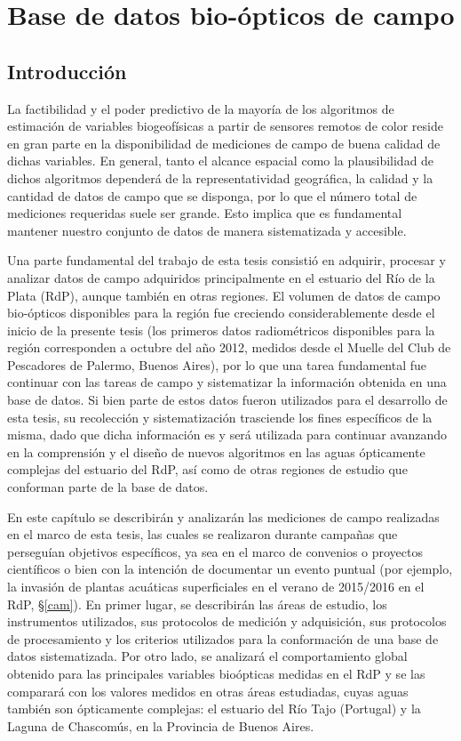 \chapter{Base de datos bio-ópticos de campo}
\label{dat}

\section{Introducción}
\label{dat:s:intro}

    La factibilidad y el poder predictivo de la mayoría de los algoritmos de estimación de variables biogeofísicas a partir de sensores remotos de color reside en gran parte en la disponibilidad de mediciones de campo de buena calidad de dichas variables. En general, tanto el alcance espacial como la plausibilidad de dichos algoritmos dependerá de la representatividad geográfica, la calidad y la cantidad de datos de campo que se disponga, por lo que el número total de mediciones requeridas suele ser grande. Esto implica que es fundamental mantener nuestro conjunto de datos de manera sistematizada y accesible.
    
    Una parte fundamental del trabajo de esta tesis consistió en adquirir, procesar y analizar datos de campo adquiridos principalmente en el estuario del Río de la Plata (RdP), aunque también en otras regiones. El volumen de datos de campo bio-ópticos disponibles para la región fue creciendo considerablemente desde el inicio de la presente tesis (los primeros datos radiométricos disponibles para la región corresponden a octubre del año 2012, medidos desde el Muelle del Club de Pescadores de Palermo, Buenos Aires), por lo que una tarea fundamental fue continuar con las tareas de campo y sistematizar la información obtenida en una base de datos. Si bien parte de estos datos fueron utilizados para el desarrollo de esta tesis, su recolección y sistematización trasciende los fines específicos de la misma, dado que dicha información es y será utilizada para continuar avanzando en la comprensión y el diseño de nuevos algoritmos en las aguas ópticamente complejas del estuario del RdP, así como de otras regiones de estudio que conforman parte de la base de datos.
    
    En este capítulo se describirán y analizarán las mediciones de campo realizadas en el marco de esta tesis, las cuales se realizaron durante campañas que perseguían objetivos específicos, ya sea en el marco de convenios o proyectos científicos o bien con la intención de documentar un evento puntual (por ejemplo, la invasión de plantas acuáticas superficiales en el verano de 2015/2016 en el RdP, \S \ref{cam}). En primer lugar, se describirán las áreas de estudio, los instrumentos utilizados, sus protocolos de medición y adquisición, sus protocolos de procesamiento y los criterios utilizados para la conformación de una base de datos sistematizada. Por otro lado, se analizará el comportamiento global obtenido para las principales variables bioópticas medidas en el RdP y se las comparará con los valores medidos en otras áreas estudiadas, cuyas aguas también son ópticamente complejas: el estuario del Río Tajo (Portugal) y la Laguna de Chascomús, en la Provincia de Buenos Aires.
   
